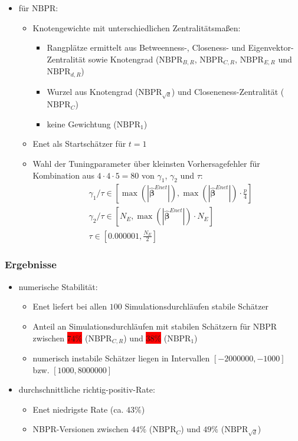 \documentclass{beamer}
\begin{document}
\begin{frame}
	\begin{itemize}
	\item für $\text{NBPR}$:
	\begin{itemize}
	\item Knotengewichte mit unterschiedlichen Zentralitätsmaßen:
	\begin{itemize}
	\item Rangplätze ermittelt aus Betweenness-, Closeness- und Eigenvektor-Zentralität sowie Knotengrad ($\text{NBPR}_{B,R}$, $\text{NBPR}_{C,R}$, $\text{NBPR}_{E,R}$ und $\text{NBPR}_{d,R}$)
	\item Wurzel aus Knotengrad ($\text{NBPR}_{\sqrt{d}}$) und Closeneness-Zentralität ($\text{NBPR}_{C}$)
	\item keine Gewichtung ($\text{NBPR}_{1}$)
	\end{itemize}
	\item Enet als Startschätzer für $t=1$
	\item Wahl der Tuningparameter über kleinsten Vorhersagefehler für Kombination aus $4\cdot 4 \cdot 5 =80$ von $\gamma_1$, $\gamma_2$ und $\tau$:
	\begin{align*}
	&\gamma_1/\tau \in \left[ \max(|\boldsymbol{\hat{\beta}}^{Enet}|), \max(|\boldsymbol{\hat{\beta}}^{Enet}|) \cdot \frac{p}{4} \right] \\
	&\gamma_2/\tau \in \left[ N_E, \max(|\boldsymbol{\hat{\beta}}^{Enet}|) \cdot N_E \right]\\
	&\tau \in \left[0.000001, \frac{N_E}{2}\right]
	\end{align*}
	\end{itemize}
	\end{itemize}
\end{frame}


\begin{frame}
	\frametitle{Ergebnisse}
	\begin{itemize}
	\item numerische Stabilität:
	\begin{itemize}
	\item Enet liefert bei allen $100$ Simulationsdurchläufen stabile Schätzer
	\item Anteil an Simulationsdurchläufen mit stabilen Schätzern für NBPR zwischen \colorbox{red}{$74\%$} ($\text{NBPR}_{C,R}$) und \colorbox{red}{$38\%$} ($\text{NBPR}_{1}$)
	\item numerisch instabile Schätzer liegen in Intervallen $[-2000000,-1000]$ bzw. $[1000,8000000]$
	\end{itemize}
	\item durchschnittliche richtig-positiv-Rate:
	\begin{itemize}
	\item Enet niedrigste Rate (ca. $43\%$)
	\item NBPR-Versionen zwischen $44\%$ ($\text{NBPR}_{C}$) und $49\%$ ($\text{NBPR}_{\sqrt{d}}$)
	\end{itemize}
	\end{itemize}
\end{frame}
\end{document}
